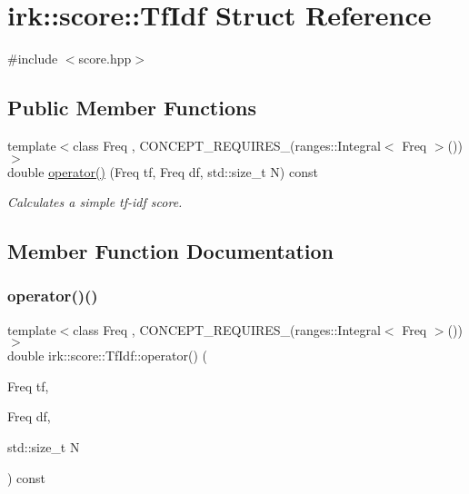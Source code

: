 \hypertarget{structirk_1_1score_1_1TfIdf}{}\section{irk\+:\+:score\+:\+:Tf\+Idf Struct Reference}
\label{structirk_1_1score_1_1TfIdf}


{\ttfamily \#include $<$score.\+hpp$>$}

\subsection*{Public Member Functions}
\begin{DoxyCompactItemize}
\item 
{\footnotesize template$<$class Freq , C\+O\+N\+C\+E\+P\+T\+\_\+\+R\+E\+Q\+U\+I\+R\+E\+S\+\_\+(ranges\+::\+Integral$<$ Freq $>$()) $>$ }\\double \mbox{\hyperlink{structirk_1_1score_1_1TfIdf_afdd7e94fc8a537785dfd503391d652aa}{operator()}} (Freq tf, Freq df, std\+::size\+\_\+t N) const
\begin{DoxyCompactList}\small\item\em Calculates a simple tf-\/idf score. \end{DoxyCompactList}\end{DoxyCompactItemize}


\subsection{Member Function Documentation}
\mbox{\label{structirk_1_1score_1_1TfIdf_afdd7e94fc8a537785dfd503391d652aa}} 
\subsubsection{\texorpdfstring{operator()()}{operator()()}}
{\footnotesize\ttfamily template$<$class Freq , C\+O\+N\+C\+E\+P\+T\+\_\+\+R\+E\+Q\+U\+I\+R\+E\+S\+\_\+(ranges\+::\+Integral$<$ Freq $>$()) $>$ \\
double irk\+::score\+::\+Tf\+Idf\+::operator() (\begin{DoxyParamCaption}\item[{Freq}]{tf,  }\item[{Freq}]{df,  }\item[{std\+::size\+\_\+t}]{N }\end{DoxyParamCaption}) const\hspace{0.3cm}{\ttfamily [inline]}}



